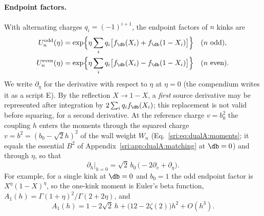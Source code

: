 \paragraph{Endpoint factors.} With alternating charges $q_i=(-1)^{i+1}$, the endpoint factors of $n$ kinks are
\begin{equation}
\begin{aligned}
 U_n^{\rm odd}(\eta)&=\exp\Bigl\{\eta\sum_iq_i\bigl[f_{\db}(X_i)+f_{\db}(1-X_i)\bigr]\Bigr\}&&(n\text{ odd}),\\
 U_n^{\rm even}(\eta)&=\exp\Bigl\{\eta\sum_iq_i\bigl[f_{\db}(X_i)-f_{\db}(1-X_i)\bigr]\Bigr\}&&(n\text{ even}).
\end{aligned}
\label{sri:eq:dualA:endpoint}
\end{equation}
We write $\partial_\eta$ for the derivative with respect to $\eta$ at $\eta=0$ (the compendium writes it as a script E).
By the reflection $X\to1-X$, a \emph{first} source derivative may be represented after integration by
$2\sum_iq_if_{\db}(X_i)$; this replacement is not valid before squaring, for a second derivative. At the reference
charge $v=b_0^2$ the coupling $h$ enters the moments through the squared charge $v=b^2=(b_0-\sqrt2h)^2$ of the wall
weight $W_n$ (Eq.~\eqref{sri:eq:dualA:moments}; it equals the essential $B^2$ of Appendix~\ref{sri:app:dualA:matching} at
$\db=0$) and through $\eta$, so that
\begin{equation}
 \partial_h\big|_{h=0}=\sqrt2\,b_0\,\bigl(-2\partial_v+\partial_\eta\bigr).
 \label{sri:eq:dualA:sourcechain}
\end{equation}
For example, for a single kink at $\db=0$ and $b_0=1$ the odd endpoint factor is $X^\eta(1-X)^\eta$, so the
one-kink moment is Euler's beta function, $A_1(h)=\Gamma(1+\eta)^2/\Gamma(2+2\eta)$, and
\begin{equation}
 A_1(h)=1-2\sqrt2\,h+\bigl(12-2\zeta(2)\bigr)h^2+O(h^3).
 \label{sri:eq:dualA:A1}
\end{equation}

